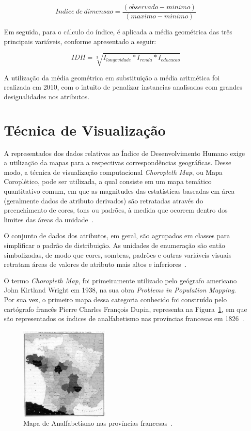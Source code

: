 \documentclass[conference]{IEEEtran}
\begin{document}
\[ Indice\: de \: dimensao = \frac{(observado - minimo)}{(maximo - minimo)} \] 

Em seguida, para o cálculo do índice, é aplicada a média geométrica  das três principais variáveis, conforme apresentado a seguir:

\[ IDH = \sqrt[3]{I_{longevidade}*I_{renda}*I_{educacao}} \]

A utilização da média geométrica em substituição a média aritmética foi realizada em 2010, com o intuito de penalizar instancias analisadas com grandes desigualidades nos atributos.

\section{Técnica de Visualização}
\label{section:tecnica}

A representados dos dados relativos ao Índice de Desenvolvimento Humano exige a utilização da mapas para a respectivas correspondências geográficas. Desse modo, a técnica de visualização computacional \textit{Choropleth Map}, ou Mapa Coroplético, pode ser utilizada, a qual consiste em um mapa temático quantitativo comum, em que as magnitudes das estatísticas baseadas em área (geralmente dados de atributo derivados) são retratadas através do preenchimento de cores, tons ou padrões, à medida que ocorrem dentro dos limites das áreas da unidade~\cite{torguson}. 

O conjunto de dados dos atributos, em geral, são agrupados em classes para simplificar o padrão de distribuição. As unidades de enumeração são então simbolizadas, de modo que cores, sombras, padrões e outras variáveis visuais retratam áreas de valores de atributo mais altos e inferiores~\cite{torguson}. 

O termo \textit{Choropleth Map}, foi primeiramente utilizado pelo geógrafo americano John Kirtland Wright em 1938, na sua obra \textit{Problems in Population Mapping}. Por sua vez, o primeiro mapa dessa categoria conhecido foi construído pelo cartógrafo francês Pierre Charles François Dupin, representa na Figura~\ref{img:analfabetismo-franca}, em que são representados os índices de analfabetismo nas províncias francesas em 1826~\cite{mac}.

\begin{figure}[!ht]
\centering
\includegraphics[width=0.4\textwidth]{analfabetismo-franca.jpg}
\caption{Mapa de Analfabetismo nas províncias francesas~\cite{mac}.}
\label{img:analfabetismo-franca}
\end{figure}
\end{document}
